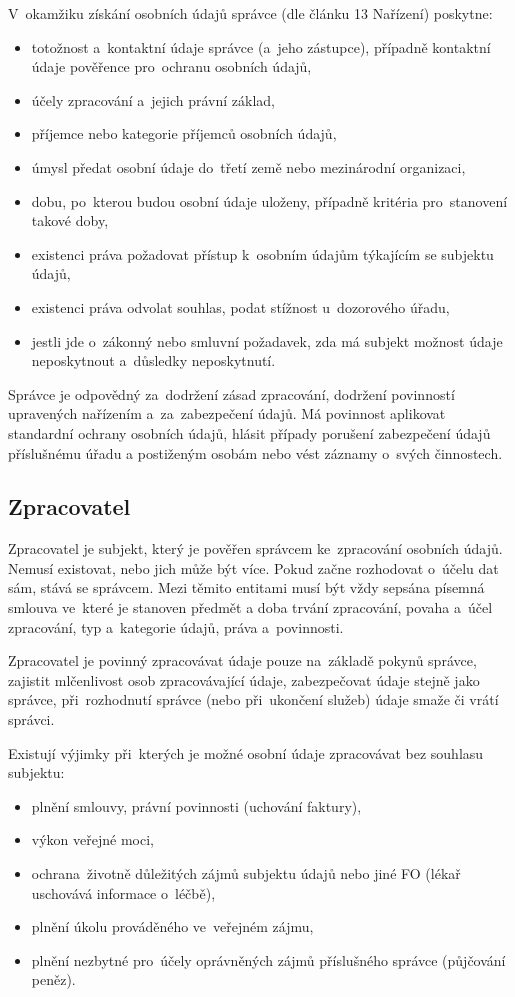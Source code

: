 V~okamžiku získání osobních údajů správce (dle článku 13 Nařízení) poskytne:

\begin{itemize}
    \item totožnost a~kontaktní údaje správce (a~jeho zástupce), případně kontaktní údaje pověřence pro~ochranu osobních údajů,
    \item účely zpracování a~jejich právní základ,
    \item příjemce nebo kategorie příjemců osobních údajů,
    \item úmysl předat osobní údaje do~třetí země nebo mezinárodní organizaci,
    \item dobu, po~kterou budou osobní údaje uloženy, případně kritéria pro~stanovení takové doby,
    \item existenci práva požadovat přístup k~osobním údajům týkajícím se subjektu údajů,
    \item existenci práva odvolat souhlas, podat stížnost u~dozorového úřadu,
    \item jestli jde o~zákonný nebo smluvní požadavek, zda má subjekt možnost údaje neposkytnout a~důsledky neposkytnutí.
\end{itemize}

Správce je odpovědný za~dodržení zásad zpracování, dodržení povinností upravených nařízením a~za~zabezpečení údajů.
Má povinnost aplikovat standardní ochrany osobních údajů, hlásit případy porušení zabezpečení údajů příslušnému úřadu a postiženým osobám nebo vést záznamy o~svých činnostech.


\subsection{Zpracovatel}

Zpracovatel je subjekt, který je pověřen správcem ke~zpracování osobních údajů.
Nemusí existovat, nebo jich může být více.
Pokud začne rozhodovat o~účelu dat sám, stává se správcem.
Mezi těmito entitami musí být vždy sepsána písemná smlouva ve~které je stanoven předmět a doba trvání zpracování, povaha a~účel zpracování, typ a~kategorie údajů, práva a~povinnosti.

Zpracovatel je povinný zpracovávat údaje pouze na~základě pokynů správce, zajistit mlčenlivost osob zpracovávající údaje, zabezpečovat údaje stejně jako správce, při~rozhodnutí správce (nebo při~ukončení služeb) údaje smaže či vrátí správci.

Existují výjimky při~kterých je možné osobní údaje zpracovávat bez souhlasu subjektu:
\begin{itemize}
    \item plnění smlouvy, právní povinnosti (uchování faktury),
    \item výkon veřejné moci,
    \item ochrana~životně důležitých zájmů subjektu údajů nebo jiné FO (lékař uschovává informace o~léčbě),
    \item plnění úkolu prováděného ve~veřejném zájmu,
    \item plnění nezbytné pro~účely oprávněných zájmů příslušného správce (půjčování peněz).
\end{itemize}


